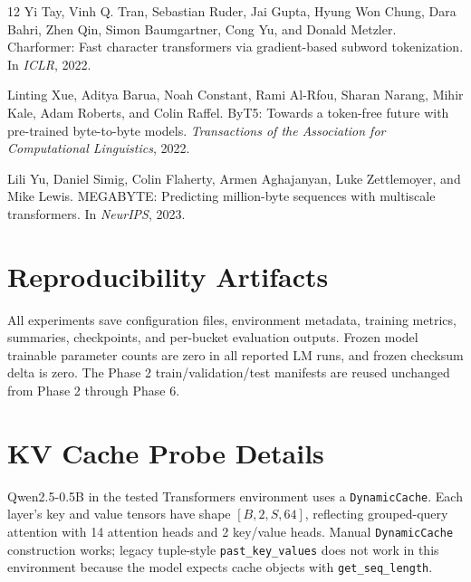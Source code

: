 \documentclass{article}
\begin{document}
\begin{thebibliography}{12}
Yi Tay, Vinh Q. Tran, Sebastian Ruder, Jai Gupta, Hyung Won Chung, Dara Bahri, Zhen Qin, Simon Baumgartner, Cong Yu, and Donald Metzler.
\newblock Charformer: Fast character transformers via gradient-based subword tokenization.
\newblock In \emph{ICLR}, 2022.

Linting Xue, Aditya Barua, Noah Constant, Rami Al-Rfou, Sharan Narang, Mihir Kale, Adam Roberts, and Colin Raffel.
\newblock ByT5: Towards a token-free future with pre-trained byte-to-byte models.
\newblock \emph{Transactions of the Association for Computational Linguistics}, 2022.

Lili Yu, Daniel Simig, Colin Flaherty, Armen Aghajanyan, Luke Zettlemoyer, and Mike Lewis.
\newblock MEGABYTE: Predicting million-byte sequences with multiscale transformers.
\newblock In \emph{NeurIPS}, 2023.

\end{thebibliography}

\appendix

\section{Reproducibility Artifacts}

All experiments save configuration files, environment metadata, training metrics, summaries, checkpoints, and per-bucket evaluation outputs. Frozen model trainable parameter counts are zero in all reported LM runs, and frozen checksum delta is zero. The Phase 2 train/validation/test manifests are reused unchanged from Phase 2 through Phase 6.

\section{KV Cache Probe Details}

Qwen2.5-0.5B in the tested Transformers environment uses a \texttt{DynamicCache}. Each layer's key and value tensors have shape $[B, 2, S, 64]$, reflecting grouped-query attention with 14 attention heads and 2 key/value heads. Manual \texttt{DynamicCache} construction works; legacy tuple-style \texttt{past\_key\_values} does not work in this environment because the model expects cache objects with \texttt{get\_seq\_length}.
\end{document}
